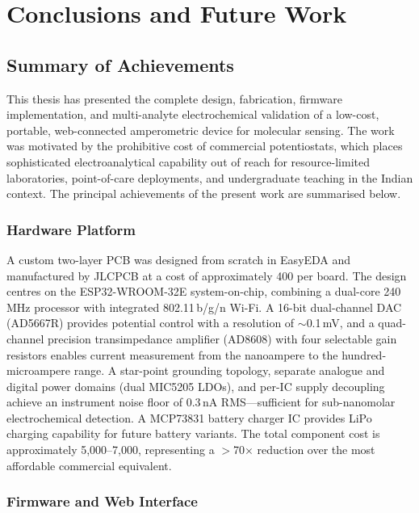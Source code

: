 \chapter{Conclusions and Future Work}
\label{ch:conclusion}

\section{Summary of Achievements}
\label{sec:summary}

This thesis has presented the complete design, fabrication, firmware implementation, and multi-analyte electrochemical validation of a low-cost, portable, web-connected amperometric device for molecular sensing. The work was motivated by the prohibitive cost of commercial potentiostats, which places sophisticated electroanalytical capability out of reach for resource-limited laboratories, point-of-care deployments, and undergraduate teaching in the Indian context. The principal achievements of the present work are summarised below.

\subsection{Hardware Platform}

A custom two-layer PCB was designed from scratch in EasyEDA and manufactured by JLCPCB at a cost of approximately \rupee{}400 per board. The design centres on the ESP32-WROOM-32E system-on-chip, combining a dual-core 240\,MHz processor with integrated 802.11\,b/g/n Wi-Fi. A 16-bit dual-channel DAC (AD5667R) provides potential control with a resolution of $\sim$0.1\,mV, and a quad-channel precision transimpedance amplifier (AD8608) with four selectable gain resistors enables current measurement from the nanoampere to the hundred-microampere range. A star-point grounding topology, separate analogue and digital power domains (dual MIC5205 LDOs), and per-IC supply decoupling achieve an instrument noise floor of 0.3\,nA RMS—sufficient for sub-nanomolar electrochemical detection. A MCP73831 battery charger IC provides LiPo charging capability for future battery variants. The total component cost is approximately \rupee{}5,000--7,000, representing a $>$70$\times$ reduction over the most affordable commercial equivalent.

\subsection{Firmware and Web Interface}

